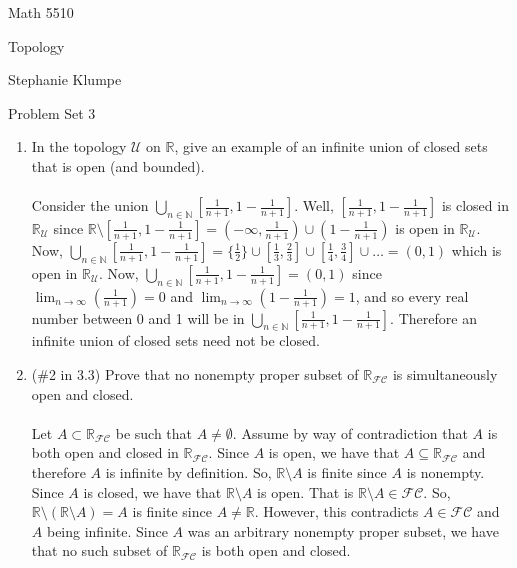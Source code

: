 \documentclass[12pt]{article}
\begin{document}
\noindent Math 5510

\noindent Topology

\noindent Stephanie Klumpe

\vspace{.2in}
\begin{center}
Problem Set 3
\end{center}

 \begin{enumerate}%
\item In the topology $\mathcal{U}$ on $\mathbb{R}$, give an example of an infinite union of closed sets that is open (and bounded).\\\\
Consider the union $\bigcup_{n\in\mathbb{N}}[\frac{1}{n+1},1-\frac{1}{n+1}]$. Well, $[\frac{1}{n+1},1-\frac{1}{n+1}]$ is closed in $\mathbb{R}_{\mathcal{U}}$ since $\mathbb{R}\setminus[\frac{1}{n+1},1-\frac{1}{n+1}]=(-\infty,\frac{1}{n+1})\cup(1-\frac{1}{n+1})$ is open in $\mathbb{R}_{\mathcal{U}}$. Now, $\bigcup_{n\in\mathbb{N}}[\frac{1}{n+1},1-\frac{1}{n+1}]=\{\frac12\}\cup[\frac13,\frac23]\cup[\frac14,\frac34]\cup\ldots=(0,1)$ which is open in $\mathbb{R}_{\mathcal{U}}$. Now, $\bigcup_{n\in\mathbb{N}}[\frac{1}{n+1},1-\frac{1}{n+1}]=(0,1)$ since $\lim_{n\rightarrow\infty}(\frac{1}{n+1})=0$ and $\lim_{n\rightarrow\infty}(1-\frac{1}{n+1})=1$, and so every real number between 0 and 1 will be in $\bigcup_{n\in\mathbb{N}}[\frac{1}{n+1},1-\frac{1}{n+1}]$. Therefore an infinite union of closed sets need not be closed.\\[20pt]

\item (\#2 in 3.3) Prove that no nonempty proper subset of $\mathbb{R}_{\mathcal{FC}}$ is simultaneously open and closed.\\\\
Let $A\subset\mathbb{R}_{\mathcal{FC}}$ be such that $A\neq\emptyset$. Assume by way of contradiction that $A$ is both open and closed in $\mathbb{R}_{\mathcal{FC}}$. Since $A$ is open, we have that $A\subseteq\mathbb{R}_{\mathcal{FC}}$ and therefore $A$ is infinite by definition. So, $\mathbb{R}\setminus A$ is finite since $A$ is nonempty. Since $A$ is closed, we have that $\mathbb{R}\setminus A$ is open. That is $\mathbb{R}\setminus A\in\mathcal{FC}$. So, $\mathbb{R}\setminus(\mathbb{R}\setminus A)=A$ is finite since $A\neq\mathbb{R}$. However, this contradicts $A\in\mathcal{FC}$ and $A$ being infinite. Since $A$ was an arbitrary nonempty proper subset, we have that no such subset of $\mathbb{R}_{\mathcal{FC}}$ is both open and closed.\\[20pt]


\end{enumerate}
\end{document}
